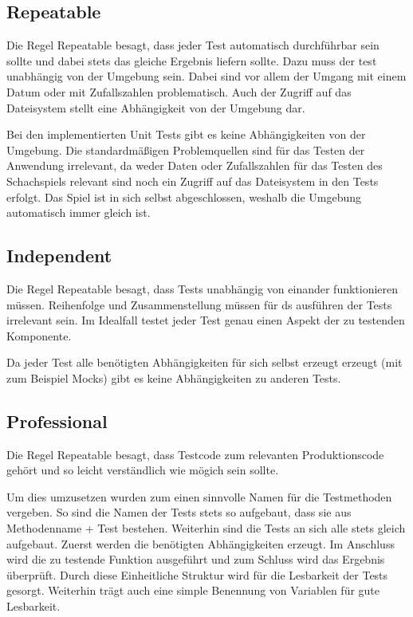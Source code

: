 \subsection{Repeatable}
Die Regel \glqq{}Repeatable\grqq{} besagt, dass jeder Test automatisch durchführbar sein sollte und dabei stets das gleiche Ergebnis liefern sollte. Dazu muss der test unabhängig von der Umgebung sein. Dabei sind vor allem der Umgang mit einem Datum oder mit Zufallszahlen problematisch. Auch der Zugriff auf das Dateisystem stellt eine Abhängigkeit von der Umgebung dar.

Bei den implementierten Unit Tests gibt es keine Abhängigkeiten von der Umgebung. Die standardmäßigen Problemquellen sind für das Testen der Anwendung irrelevant, da weder Daten oder Zufallszahlen für das Testen des Schachspiels relevant sind noch ein Zugriff auf das Dateisystem in den Tests erfolgt. Das Spiel ist in sich selbst abgeschlossen, weshalb die Umgebung automatisch immer gleich ist.

\subsection{Independent}
Die Regel \glqq{}Repeatable\grqq{} besagt, dass Tests unabhängig von einander funktionieren müssen. Reihenfolge und Zusammenstellung müssen für ds ausführen der Tests irrelevant sein. Im Idealfall testet jeder Test genau einen Aspekt der zu testenden Komponente.

Da jeder Test alle benötigten Abhängigkeiten für sich selbst erzeugt erzeugt (mit zum Beispiel Mocks) gibt es keine Abhängigkeiten zu anderen Tests.

\subsection{Professional}
Die Regel \glqq{}Repeatable\grqq{} besagt, dass Testcode zum relevanten Produktionscode gehört und so leicht verständlich wie mögich sein sollte.

Um dies umzusetzen wurden zum einen sinnvolle Namen für die Testmethoden vergeben. So sind die Namen der Tests stets so aufgebaut, dass sie aus Methodenname + \glqq{}Test\grqq{} bestehen. Weiterhin sind die Tests an sich alle stets gleich aufgebaut. Zuerst werden die benötigten Abhängigkeiten erzeugt. Im Anschluss wird die zu testende Funktion ausgeführt und zum Schluss wird das Ergebnis überprüft. Durch diese Einheitliche Struktur wird für die Lesbarkeit der Tests gesorgt.  Weiterhin trägt auch eine simple Benennung von Variablen für gute Lesbarkeit.

